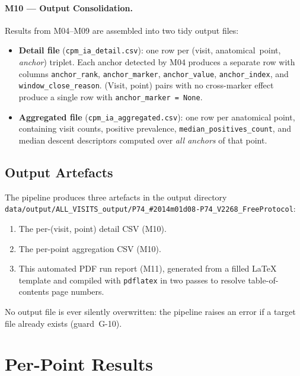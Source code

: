 \documentclass[a4paper,11pt]{article}
\begin{document}
\paragraph{M10 --- Output Consolidation.}
Results from M04--M09 are assembled into two tidy output files:
\begin{itemize}
  \item \textbf{Detail file} (\texttt{cpm\_ia\_detail.csv}): one row per
        (visit, anatomical~point, \emph{anchor}) triplet. Each anchor detected by M04
        produces a separate row with columns \texttt{anchor\_rank},
        \texttt{anchor\_marker}, \texttt{anchor\_value}, \texttt{anchor\_index},
        and \texttt{window\_close\_reason}.
        (Visit, point) pairs with no cross-marker effect produce a single row with
        \texttt{anchor\_marker = None}.
  \item \textbf{Aggregated file} (\texttt{cpm\_ia\_aggregated.csv}): one row per
        anatomical point, containing visit counts, positive prevalence,
        \texttt{median\_positives\_count}, and median descent descriptors computed over
        \emph{all anchors} of that point.
\end{itemize}

\subsection{Output Artefacts}

The pipeline produces three artefacts in the output directory \texttt{data/output/ALL\_VISITS\_output/P74\_\#2014m01d08-P74\_V2268\_FreeProtocol}:
\begin{enumerate}
  \item The per-(visit, point) detail CSV (M10).
  \item The per-point aggregation CSV (M10).
  \item This automated PDF run report (M11), generated from a filled \LaTeX{} template
        and compiled with \texttt{pdflatex} in two passes to resolve table-of-contents
        page numbers.
\end{enumerate}
No output file is ever silently overwritten: the pipeline raises an error if a target
file already exists (guard~G-10).

\section{Per-Point Results}
\end{document}
